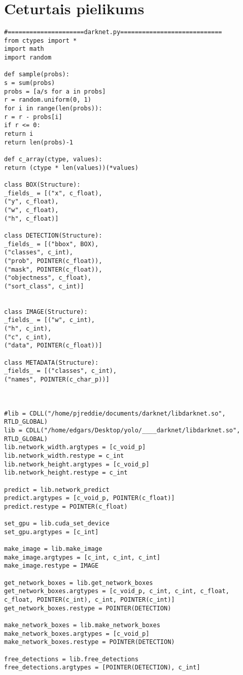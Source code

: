 \documentclass[12pt,paper=a4]{report}
\begin{document}
\chapter{Ceturtais pielikums}
\label{appendix:pielikums4}
\begin{lstlisting}
#=====================darknet.py============================
from ctypes import *
import math
import random

def sample(probs):
s = sum(probs)
probs = [a/s for a in probs]
r = random.uniform(0, 1)
for i in range(len(probs)):
r = r - probs[i]
if r <= 0:
return i
return len(probs)-1

def c_array(ctype, values):
return (ctype * len(values))(*values)

class BOX(Structure):
_fields_ = [("x", c_float),
("y", c_float),
("w", c_float),
("h", c_float)]

class DETECTION(Structure):
_fields_ = [("bbox", BOX),
("classes", c_int),
("prob", POINTER(c_float)),
("mask", POINTER(c_float)),
("objectness", c_float),
("sort_class", c_int)]


class IMAGE(Structure):
_fields_ = [("w", c_int),
("h", c_int),
("c", c_int),
("data", POINTER(c_float))]

class METADATA(Structure):
_fields_ = [("classes", c_int),
("names", POINTER(c_char_p))]



#lib = CDLL("/home/pjreddie/documents/darknet/libdarknet.so", RTLD_GLOBAL)
lib = CDLL("/home/edgars/Desktop/yolo/____darknet/libdarknet.so", RTLD_GLOBAL)
lib.network_width.argtypes = [c_void_p]
lib.network_width.restype = c_int
lib.network_height.argtypes = [c_void_p]
lib.network_height.restype = c_int

predict = lib.network_predict
predict.argtypes = [c_void_p, POINTER(c_float)]
predict.restype = POINTER(c_float)

set_gpu = lib.cuda_set_device
set_gpu.argtypes = [c_int]

make_image = lib.make_image
make_image.argtypes = [c_int, c_int, c_int]
make_image.restype = IMAGE

get_network_boxes = lib.get_network_boxes
get_network_boxes.argtypes = [c_void_p, c_int, c_int, c_float, c_float, POINTER(c_int), c_int, POINTER(c_int)]
get_network_boxes.restype = POINTER(DETECTION)

make_network_boxes = lib.make_network_boxes
make_network_boxes.argtypes = [c_void_p]
make_network_boxes.restype = POINTER(DETECTION)

free_detections = lib.free_detections
free_detections.argtypes = [POINTER(DETECTION), c_int]


\end{lstlisting}
\end{document}
